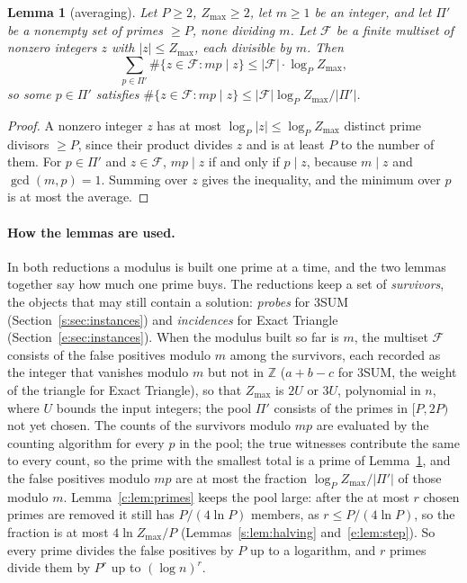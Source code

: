 \documentclass[11pt]{article}
\newtheorem{lemma}[theorem]{Lemma}
\theoremstyle{definition}
\theoremstyle{remark}
\newcommand{\Z}{\mathbb{Z}}
\begin{document}
\begin{lemma}[averaging]\label{c:lem:avg}
Let $P\ge2$, $Z_{\max}\ge2$, let $m\ge1$ be an integer, and let $\Pi'$ be a nonempty set of primes $\ge P$, none dividing $m$. Let $\mathcal F$ be a finite multiset of nonzero integers $z$ with $|z|\le Z_{\max}$, each divisible by $m$. Then
\[
\sum_{p\in\Pi'}\#\{z\in\mathcal F: mp\mid z\}\le|\mathcal F|\cdot\log_PZ_{\max},
\]
so some $p\in\Pi'$ satisfies $\#\{z\in\mathcal F: mp\mid z\}\le|\mathcal F|\log_PZ_{\max}/|\Pi'|$.
\end{lemma}
\begin{proof}
A nonzero integer $z$ has at most $\log_P|z|\le\log_PZ_{\max}$ distinct prime divisors $\ge P$, since their product divides $z$ and is at least $P$ to the number of them. For $p\in\Pi'$ and $z\in\mathcal F$, $mp\mid z$ if and only if $p\mid z$, because $m\mid z$ and $\gcd(m,p)=1$. Summing over $z$ gives the inequality, and the minimum over $p$ is at most the average.
\end{proof}

\paragraph{How the lemmas are used.} In both reductions a modulus is built one prime at a time, and the two lemmas together say how much one prime buys. The reductions keep a set of \emph{survivors}, the objects that may still contain a solution: \emph{probes} for 3SUM (Section~\ref{s:sec:instances}) and \emph{incidences} for Exact Triangle (Section~\ref{e:sec:instances}). When the modulus built so far is $m$, the multiset $\mathcal F$ consists of the false positives modulo $m$ among the survivors, each recorded as the integer that vanishes modulo $m$ but not in $\Z$ ($a+b-c$ for 3SUM, the weight of the triangle for Exact Triangle), so that $Z_{\max}$ is $2U$ or $3U$, polynomial in $n$, where $U$ bounds the input integers; the pool $\Pi'$ consists of the primes in $[P,2P)$ not yet chosen. The counts of the survivors modulo $mp$ are evaluated by the counting algorithm for every $p$ in the pool; the true witnesses contribute the same to every count, so the prime with the smallest total is a prime of Lemma~\ref{c:lem:avg}, and the false positives modulo $mp$ are at most the fraction $\log_PZ_{\max}/|\Pi'|$ of those modulo $m$. Lemma~\ref{c:lem:primes} keeps the pool large: after the at most $r$ chosen primes are removed it still has $P/(4\ln P)$ members, as $r\le P/(4\ln P)$, so the fraction is at most $4\ln Z_{\max}/P$ (Lemmas~\ref{s:lem:halving} and~\ref{e:lem:step}). So every prime divides the false positives by $P$ up to a logarithm, and $r$ primes divide them by $P^r$ up to $(\log n)^r$.
\end{document}
